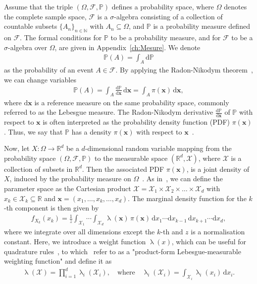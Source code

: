 Assume that the triple $(\Omega, \mathcal{F}, \mathbb{P})$ defines a probability space, where $\Omega$ denotes the complete sample space, $\mathcal{F}$ is a $\sigma$-algebra consisting of a collection of countable subsets $\{A_n\}_{n \in \mathbb{N}}$ with $A_n \subseteq \Omega$, and $\mathbb{P}$ is a probability measure defined on $\mathcal{F}$. The formal conditions for $\mathbb{P}$ to be a probability measure, and for $\mathcal{F}$ to be a $\sigma$-algebra over $\Omega$, are given in Appendix~\ref{ch:Mesure}.
We denote
\begin{align}
	\mathbb{P}(A) = \int_A \mathrm{d} \mathbb{P}
\end{align}
as the probability of an event $A \in \mathcal{F}$.
By applying the Radon-Nikodym theorem~\cite{kopp2004measintprob}, we can change variables
\begin{align}
	\mathbb{P}(A) = \int_A \frac{\mathrm{d} \mathbb{P}}{\mathrm{d}\bm{x}} \, \mathrm{d}\bm{x} = \int_A \pi(\bm{x}) \, \mathrm{d}\bm{x},
\end{align}
where $\mathrm{d}\bm{x}$ is a reference measure on the same probability space, commonly referred to as the Lebesgue measure. 
The Radon-Nikodym derivative $\frac{\mathrm{d} \mathbb{P}}{\mathrm{d}\bm{x}}$ of $\mathbb{P}$ with respect to $\bm{x}$ is often interpreted as the probability density function (PDF) $\pi(\bm{x})$. Thus, we say that $\mathbb{P}$ has a density $\pi(\bm{x})$ with respect to $\bm{x}$~\cite[Chapter 10]{simonnet1996measprob}.

Now, let $X: \Omega \longrightarrow \mathbb{R}^d$ be a $d$-dimensional random variable mapping from the probability space $(\Omega, \mathcal{F}, \mathbb{P})$ to the measurable space $(\mathbb{R}^d, \mathcal{X})$, where $\mathcal{X}$ is a collection of subsets in $\mathbb{R}^d$.
Then the associated PDF $\pi(\bm{x})$, is a joint density of $X$, induced by the probability measure on $\Omega$~\cite{VesaInvLect, kopp2004measintprob}.
As in~\cite{cui2022deep}, we can define the parameter space as the Cartesian product $\mathcal{X} = \mathcal{X}_1 \times \mathcal{X}_2 \times \dots \times \mathcal{X}_d$ with $ x_k \in \mathcal{X}_k \subseteq \mathbb{R}$ and $\bm{x} = ( x_1,\dots ,x_k,\dots,x_d )$.
The marginal density function for the $k$-th component is then given by
\begin{align}
	f_{X_k}(x_k) = \frac{1}{z} \int_{\mathcal{X}_1} \cdots \int_{\mathcal{X}_d} \uplambda(\bm{x}) \, \pi(\bm{x}) \, \mathrm{d}x_1 \cdots \mathrm{d}x_{k-1} \, \mathrm{d}x_{k+1} \cdots \mathrm{d}x_d, \label{eq:margInt}
\end{align}
where we integrate over all dimensions except the $k$-th and $z$ is a normalisation constant.
Here, we introduce a weight function $\uplambda(x)$, which can be useful for quadrature rules~\cite{davis2007methods}, to which~\cite{cui2022deep} refer to as a "product-form Lebesgue-measurable weighting function" and define it as
\begin{align}
	\uplambda(\mathcal{X}) = \prod_{i = 1}^{d} \uplambda_i(\mathcal{X}_i), \quad \text{where} \quad \uplambda_i(\mathcal{X}_i) = \int_{\mathcal{X}_i} \uplambda_i(x_i) \, \mathrm{d}x_i. \label{eq:lebesgueWeight}
\end{align}

